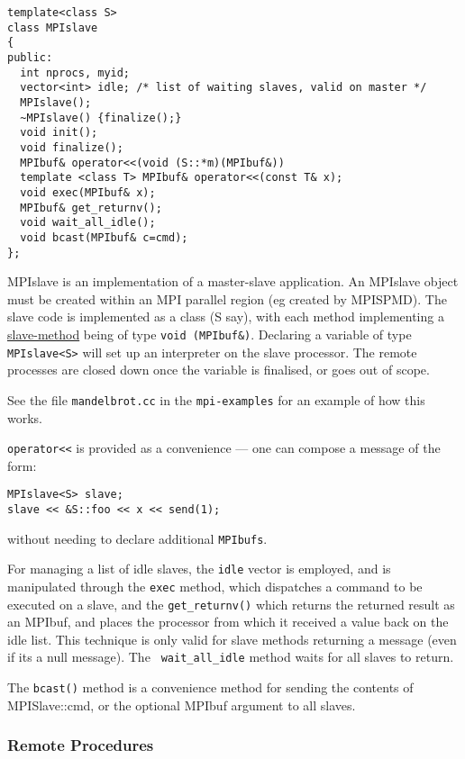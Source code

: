 
\begin{verbatim}
template<class S>
class MPIslave
{
public:
  int nprocs, myid;
  vector<int> idle; /* list of waiting slaves, valid on master */
  MPIslave();
  ~MPIslave() {finalize();}
  void init();
  void finalize();
  MPIbuf& operator<<(void (S::*m)(MPIbuf&))
  template <class T> MPIbuf& operator<<(const T& x);
  void exec(MPIbuf& x);
  MPIbuf& get_returnv();
  void wait_all_idle();
  void bcast(MPIbuf& c=cmd);
};
\end{verbatim}

MPIslave is an implementation of a master-slave application. An
MPIslave object must be created within an MPI parallel region (eg
created by MPISPMD). The slave
code is implemented as a class (S say), with each method
implementing a \hyperref{remote procedure}{(see \S}{)}{slave-method}
being of type \verb+void (MPIbuf&)+. Declaring a variable of type
\verb+MPIslave<S>+ will set up an interpreter on the slave processor. The remote processes
are closed down once the variable is finalised, or goes out of scope. 

See the file {\tt mandelbrot.cc} in the {\tt mpi-examples} for an
example of how this works.

\verb+operator<<+ is provided as a convenience --- one can compose a
message of the form:
\begin{verbatim}
MPIslave<S> slave;
slave << &S::foo << x << send(1);
\end{verbatim}
without needing to declare additional {\tt MPIbufs}.

For managing a list of idle slaves, the {\tt idle} vector
is employed, and is manipulated through the {\tt exec}
method, which dispatches a command to be executed on a slave, and the
{\tt get\_returnv()} which returns the returned
result as an MPIbuf, and places the processor from which it received a
value back on the idle list. This technique is only valid for slave
methods returning a message (even if its a null message). The {\tt
wait\_all\_idle} method waits for all slaves to
return.

The {\tt bcast()} method is a convenience method for sending the
contents of MPISlave::cmd, or the optional MPIbuf argument to all
slaves. 

\subsubsection{Remote Procedures}\label{slave-method}

